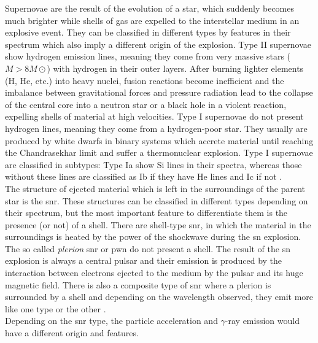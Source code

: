 \documentclass[main.tex]{subfiles}
\begin{document}
Supernovae are the result of the evolution of a star, which suddenly becomes much brighter while shells of gas are expelled to the interstellar medium in an explosive event. They can be classified in different types by features in their spectrum which also imply a different origin of the explosion. Type II supernovae show hydrogen emission lines, meaning they come from very massive stars ($M > 8 M\odot$) with hydrogen in their outer layers. After burning lighter elements (H, He, etc.) into heavy nuclei, fusion reactions become inefficient and the imbalance between gravitational forces and pressure radiation lead to the collapse of the central core into a neutron star or a black hole in a violent reaction, expelling shells of material at high velocities. Type I supernovae do not present hydrogen lines, meaning they come from a hydrogen-poor star. They usually are produced by white dwarfs in binary systems which accrete material until reaching the Chandrasekhar limit \cite{1931Chandra} and suffer a thermonuclear explosion. Type I supernovae are classified in subtypes: Type Ia show Si lines in their spectra, whereas those without these lines are classified as Ib if they have He lines and Ic if not \cite{2006osterbrock}.\\
The structure of ejected material which is left in the surroundings of the parent star is the \gls{snr}. These structures can be classified in different types depending on their spectrum, but the most important feature to differentiate them is the presence (or not) of a shell. There are shell-type \gls{snr}, in which the material in the surroundings is heated by the power of the shockwave during the \gls{sn} explosion. The so called \textit{plerion} \gls{snr} or \gls{pwn} do not present a shell. The result of the \gls{sn} explosion is always a central pulsar and their emission is produced by the interaction between electrons ejected to the medium by the pulsar and its huge magnetic field. There is also a composite type of \gls{snr} where a plerion is surrounded by a shell and depending on the wavelength observed, they emit more like one type or the other \cite{1988SNR}.\\
Depending on the \gls{snr} type, the  particle acceleration and $\gamma$-ray emission would have a different origin and features.\\
\end{document}
